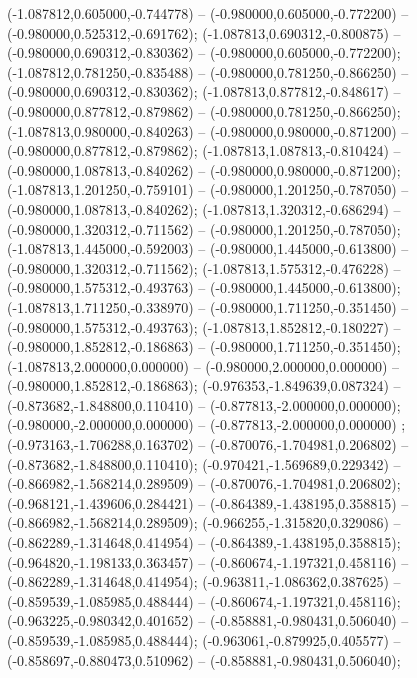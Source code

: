  (-1.087812,0.605000,-0.744778) -- (-0.980000,0.605000,-0.772200) -- (-0.980000,0.525312,-0.691762);
 (-1.087813,0.690312,-0.800875) -- (-0.980000,0.690312,-0.830362) -- (-0.980000,0.605000,-0.772200);
 (-1.087812,0.781250,-0.835488) -- (-0.980000,0.781250,-0.866250) -- (-0.980000,0.690312,-0.830362);
 (-1.087813,0.877812,-0.848617) -- (-0.980000,0.877812,-0.879862) -- (-0.980000,0.781250,-0.866250);
 (-1.087813,0.980000,-0.840263) -- (-0.980000,0.980000,-0.871200) -- (-0.980000,0.877812,-0.879862);
 (-1.087813,1.087813,-0.810424) -- (-0.980000,1.087813,-0.840262) -- (-0.980000,0.980000,-0.871200);
 (-1.087813,1.201250,-0.759101) -- (-0.980000,1.201250,-0.787050) -- (-0.980000,1.087813,-0.840262);
 (-1.087813,1.320312,-0.686294) -- (-0.980000,1.320312,-0.711562) -- (-0.980000,1.201250,-0.787050);
 (-1.087813,1.445000,-0.592003) -- (-0.980000,1.445000,-0.613800) -- (-0.980000,1.320312,-0.711562);
 (-1.087813,1.575312,-0.476228) -- (-0.980000,1.575312,-0.493763) -- (-0.980000,1.445000,-0.613800);
 (-1.087813,1.711250,-0.338970) -- (-0.980000,1.711250,-0.351450) -- (-0.980000,1.575312,-0.493763);
 (-1.087813,1.852812,-0.180227) -- (-0.980000,1.852812,-0.186863) -- (-0.980000,1.711250,-0.351450);
 (-1.087813,2.000000,0.000000) -- (-0.980000,2.000000,0.000000) -- (-0.980000,1.852812,-0.186863);
 (-0.976353,-1.849639,0.087324) -- (-0.873682,-1.848800,0.110410) -- (-0.877813,-2.000000,0.000000);
 (-0.980000,-2.000000,0.000000) -- (-0.877813,-2.000000,0.000000) ;
 (-0.973163,-1.706288,0.163702) -- (-0.870076,-1.704981,0.206802) -- (-0.873682,-1.848800,0.110410);
 (-0.970421,-1.569689,0.229342) -- (-0.866982,-1.568214,0.289509) -- (-0.870076,-1.704981,0.206802);
 (-0.968121,-1.439606,0.284421) -- (-0.864389,-1.438195,0.358815) -- (-0.866982,-1.568214,0.289509);
 (-0.966255,-1.315820,0.329086) -- (-0.862289,-1.314648,0.414954) -- (-0.864389,-1.438195,0.358815);
 (-0.964820,-1.198133,0.363457) -- (-0.860674,-1.197321,0.458116) -- (-0.862289,-1.314648,0.414954);
 (-0.963811,-1.086362,0.387625) -- (-0.859539,-1.085985,0.488444) -- (-0.860674,-1.197321,0.458116);
 (-0.963225,-0.980342,0.401652) -- (-0.858881,-0.980431,0.506040) -- (-0.859539,-1.085985,0.488444);
 (-0.963061,-0.879925,0.405577) -- (-0.858697,-0.880473,0.510962) -- (-0.858881,-0.980431,0.506040);
